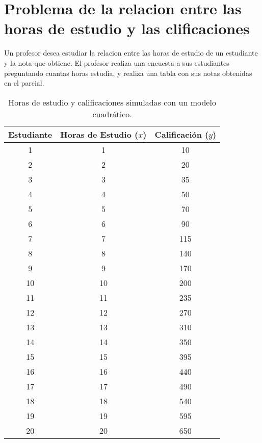 \documentclass{article}
\begin{document}
\section{Problema de la relacion entre las horas de estudio y las clificaciones}

Un profesor desea estudiar la relacion entre las horas de estudio de un estudiante y la nota que obtiene. El profesor
realiza una encuesta a sus estudiantes preguntando cuantas horas estudia, y realiza una tabla con sus notas obtenidas 
en el parcial.

\begin{table}[h!]
    \centering
    \begin{tabular}{ccc}
    \toprule
    \textbf{Estudiante} & \textbf{Horas de Estudio (\(x\))} & \textbf{Calificación (\(y\))} \\
    \midrule
    1  & 1  & 10  \\
    2  & 2  & 20  \\
    3  & 3  & 35  \\
    4  & 4  & 50  \\
    5  & 5  & 70  \\
    6  & 6  & 90  \\
    7  & 7  & 115 \\
    8  & 8  & 140 \\
    9  & 9  & 170 \\
    10 & 10 & 200 \\
    11 & 11 & 235 \\
    12 & 12 & 270 \\
    13 & 13 & 310 \\
    14 & 14 & 350 \\
    15 & 15 & 395 \\
    16 & 16 & 440 \\
    17 & 17 & 490 \\
    18 & 18 & 540 \\
    19 & 19 & 595 \\
    20 & 20 & 650 \\
    \bottomrule
    \end{tabular}
    \caption{Horas de estudio y calificaciones simuladas con un modelo cuadrático.}
    \label{tabla:horas_estudio}
    \end{table}
\end{document}
